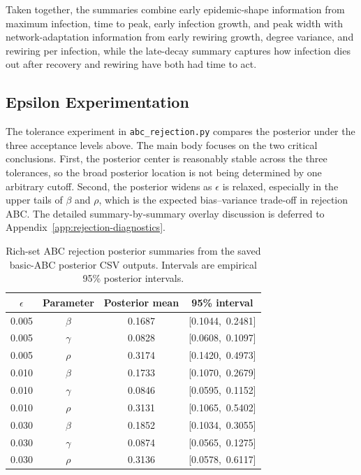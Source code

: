 \documentclass[11pt]{article}
\begin{document}
Taken together, the summaries combine early epidemic-shape information from maximum infection, time to peak, early infection growth, and peak width with network-adaptation information from early rewiring growth, degree variance, and rewiring per infection, while the late-decay summary captures how infection dies out after recovery and rewiring have both had time to act.

\subsection{Epsilon Experimentation}
\label{sec:epsilon-experimentation}

The tolerance experiment in \texttt{abc\_rejection.py} compares the posterior under the three acceptance levels above. The main body focuses on the two critical conclusions. First, the posterior center is reasonably stable across the three tolerances, so the broad posterior location is not being determined by one arbitrary cutoff. Second, the posterior widens as $\epsilon$ is relaxed, especially in the upper tails of $\beta$ and $\rho$, which is the expected bias--variance trade-off in rejection ABC. The detailed summary-by-summary overlay discussion is deferred to Appendix~\ref{app:rejection-diagnostics}.

\begin{table}[H]
\centering
\caption{Rich-set ABC rejection posterior summaries from the saved basic-ABC posterior CSV outputs. Intervals are empirical 95\% posterior intervals.}
\label{tab:epsilon-results}
\begin{tabular}{cccc}
\toprule
$\epsilon$ & Parameter & Posterior mean & 95\% interval \\
\midrule
0.005 & $\beta$ & 0.1687 & [0.1044,\ 0.2481] \\
0.005 & $\gamma$ & 0.0828 & [0.0608,\ 0.1097] \\
0.005 & $\rho$ & 0.3174 & [0.1420,\ 0.4973] \\
\midrule
0.010 & $\beta$ & 0.1733 & [0.1070,\ 0.2679] \\
0.010 & $\gamma$ & 0.0846 & [0.0595,\ 0.1152] \\
0.010 & $\rho$ & 0.3131 & [0.1065,\ 0.5402] \\
\midrule
0.030 & $\beta$ & 0.1852 & [0.1034,\ 0.3055] \\
0.030 & $\gamma$ & 0.0874 & [0.0565,\ 0.1275] \\
0.030 & $\rho$ & 0.3136 & [0.0578,\ 0.6117] \\
\bottomrule
\end{tabular}
\end{table}
\end{document}
